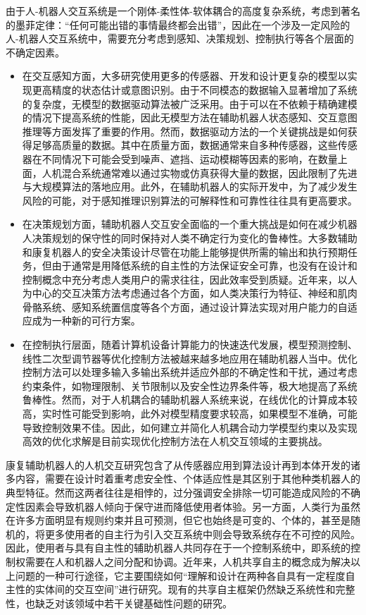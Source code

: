 由于人-机器人交互系统是一个刚体-柔性体-软体耦合的高度复杂系统，考虑到著名的墨菲定律：``任何可能出错的事情最终都会出错''，因此在一个涉及一定风险的人-机器人交互系统中，需要充分考虑到感知、决策规划、控制执行等各个层面的不确定因素。

\begin{itemize}
\item 在交互感知方面，大多研究使用更多的传感器、开发和设计更复杂的模型以实现更高精度的状态估计或意图识别。由于不同模态的数据输入显著增加了系统的复杂度，无模型的数据驱动算法被广泛采用。由于可以在不依赖于精确建模的情况下提高系统的性能，因此无模型方法在辅助机器人状态感知、交互意图推理等方面发挥了重要的作用。然而，数据驱动方法的一个关键挑战是如何获得足够高质量的数据。其中在质量方面，数据通常来自多种传感器，这些传感器在不同情况下可能会受到噪声、遮挡、运动模糊等因素的影响，在数量上面，人机混合系统通常难以通过实物或仿真获得大量的数据，因此限制了先进与大规模算法的落地应用。此外，在辅助机器人的实际开发中，为了减少发生风险的可能，对于感知推理识别算法的可解释性和可靠性往往具有更高要求。

\item 在决策规划方面，辅助机器人交互安全面临的一个重大挑战是如何在减少机器人决策规划的保守性的同时保持对人类不确定行为变化的鲁棒性。大多数辅助和康复机器人的安全决策设计尽管在功能上能够提供所需的输出和执行预期任务，但由于通常是用降低系统的自主性的方法保证安全可靠，也没有在设计和控制概念中充分考虑人类用户的需求往往，因此效率受到质疑。近年来，以人为中心的交互决策方法考虑通过各个方面，如人类决策行为特征、神经和肌肉骨骼系统、感知系统置信度等各个方面，通过设计算法实现对用户能力的自适应成为一种新的可行方案。

\item 在控制执行层面，随着计算机设备计算能力的快速迭代发展，模型预测控制、线性二次型调节器等优化控制方法被越来越多地应用在辅助机器人当中。优化控制方法可以处理多输入多输出系统并适应外部的不确定性和干扰，通过考虑约束条件，如物理限制、关节限制以及安全性边界条件等，极大地提高了系统鲁棒性。然而，对于人机耦合的辅助机器人系统来说，在线优化的计算成本较高，实时性可能受到影响，此外对模型精度要求较高，如果模型不准确，可能导致控制效果不佳。因此，如何建立并简化人机耦合动力学模型约束以及实现高效的优化求解是目前实现优化控制方法在人机交互领域的主要挑战。
\end{itemize}

康复辅助机器人的人机交互研究包含了从传感器应用到算法设计再到本体开发的诸多内容，需要在设计时着重考虑安全性、个体适应性是其区别于其他种类机器人的典型特征。然而这两者往往是相悖的，过分强调安全排除一切可能造成风险的不确定性因素会导致机器人倾向于保守进而降低使用者体验。另一方面，人类行为虽然在许多方面明显有规则约束并且可预测，但它也始终是可变的、个体的，甚至是随机的，将更多使用者的自主行为引入交互系统中则会导致系统存在不可控的风险。因此，使用者与具有自主性的辅助机器人共同存在于一个控制系统中，即系统的控制权需要在人和机器人之间分配和协调\cite{ZhaoQianTanKongZhiZhongDeGongXiangXinXiHeGongXiangZiZhu2021}。近年来，人机共享自主的概念成为解决以上问题的一种可行途径，它主要围绕如何``理解和设计在两种各自具有一定程度自主性的实体间的交互空间''进行研究\cite{abbassTrustedAutonomyCognitive2016}。现有的共享自主框架仍然缺乏系统性和完整性，也缺乏对该领域中若干关键基础性问题的研究。

